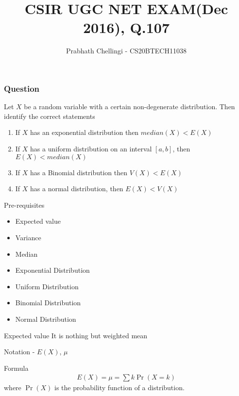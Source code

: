 \documentclass{beamer}
\title{CSIR UGC NET EXAM(Dec 2016), Q.107}
\author{Prabhath Chellingi - CS20BTECH11038}
\date{}
\providecommand{\pr}[1]{\ensuremath{\Pr\left(#1\right)}}
\begin{document}
\begin{frame}
\titlepage
\end{frame}

\begin{frame}
\frametitle{Question}

\begin{block}{}
 Let $X$ be a random variable with a certain non-degenerate distribution. Then identify the correct statements
\begin{enumerate}[1.]
    \item If $X$ has an exponential distribution then $median(X)<E(X)$
    \item If $X$ has a uniform distribution on an interval $[a,b]$, then $E(X)<median(X)$
    \item If $X$ has a Binomial distribution then $V(X)<E(X)$
    \item If $X$ has a normal distribution, then $E(X)<V(X)$
\end{enumerate}
\end{block}
\end{frame}
\begin{frame}{}
    \begin{block}{Pre-requisites }
    \begin{itemize}
        \item Expected value
        \item Variance
        \item Median
        \item Exponential Distribution
        \item Uniform Distribution
        \item Binomial Distribution
        \item Normal Distribution
    \end{itemize}
    \end{block}
\end{frame}
\begin{frame}{}
\begin{block}{Expected value}
It is nothing but weighted mean

Notation - $E(X)$, $\mu$
\end{block}
\begin{block}{Formula}
\begin{align}
    E(X)=\mu=\sum k\pr{X=k}
\end{align}
where \pr{X} is the probability function of a distribution.
\end{block}
\end{frame}
\end{document}
